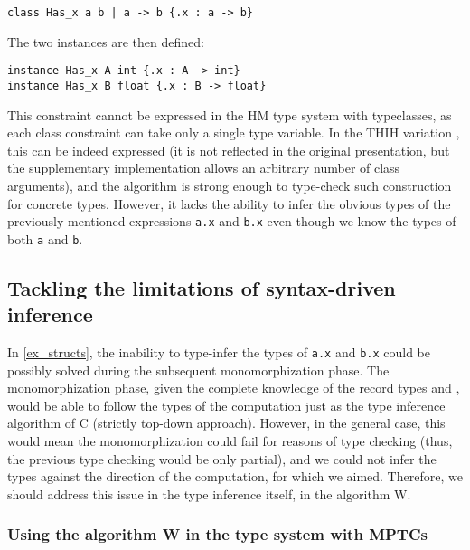 \begin{center}
    \lstinline/class Has_x a b | a -> b {.x : a -> b}/
\end{center}

The two instances are then defined:

\begin{lstlisting}
instance Has_x A int {.x : A -> int}
instance Has_x B float {.x : B -> float}
\end{lstlisting}

This constraint cannot be expressed in the HM type system with typeclasses, as each class constraint can take only a single type variable. In the THIH variation \cite{jones1999typing}, this can be indeed expressed (it is not reflected in the original presentation, but the supplementary implementation allows an arbitrary number of class arguments), and the algorithm is strong enough to type-check such construction for concrete types. However, it lacks the ability to infer the obvious types of the previously mentioned expressions \lstinline{a.x} and \lstinline{b.x} even though we know the types of both \lstinline{a} and \lstinline{b}.

\subsection{Tackling the limitations of syntax-driven inference}
\label{sec:tackle}

In \cref{ex_structs}, the inability to type-infer the types of \lstinline{a.x} and \lstinline{b.x} could be possibly solved during the subsequent monomorphization phase. The monomorphization phase, given the complete knowledge of the record types  and , would be able to follow the types of the computation just as the type inference algorithm of C (strictly top-down approach). However, in the general case, this would mean the monomorphization could fail for reasons of type checking (thus, the previous type checking would be only partial), and we could not infer the types against the direction of the computation, for which we aimed. Therefore, we should address this issue in the type inference itself, in the algorithm W.

\subsubsection{Using the algorithm W in the type system with MPTCs}

